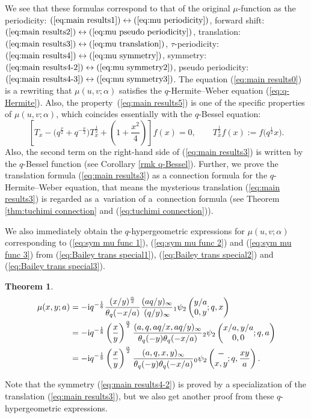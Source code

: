 \documentclass[pdftex]{sigma}
\numberwithin{equation}{section}
\newtheorem{thm}{Theorem}[section]
\theoremstyle{definition}
\begin{document}
We see that these formulas correspond to that of the original $\mu$-function as the periodicity: $(\ref{eq:main results1})\leftrightarrow(\ref{eq:mu periodicity})$,
forward shift: $(\ref{eq:main results2})\leftrightarrow(\ref{eq:mu pseudo periodicity})$,
translation: $(\ref{eq:main results3})\leftrightarrow(\ref{eq:mu translation})$,
$\tau$-periodicity: $(\ref{eq:main results4})\leftrightarrow(\ref{eq:mu symmetry})$,
symmetry: $(\ref{eq:main results4-2})\leftrightarrow(\ref{eq:mu symmetry2})$,
pseudo periodicity: $(\ref{eq:main results4-3})\leftrightarrow(\ref{eq:mu symmetry3})$.
The equation (\ref{eq:main results0}) is a rewriting that $\mu(u,v;\alpha)$ satisfies the $q$-Hermite--Weber equation (\ref{eq:q-Hermite}).
Also, the property~(\ref{eq:main results5}) is one of the specific properties of $\mu(u,v;\alpha)$, which coincides essentially with the $q$-Bessel equation:
\[
\left[T_x-\big(q^\frac{\nu}{2}+q^{-\frac{\nu}{2}}\big)T_x^\frac{1}{2}+\left(1+\frac{x^2}{4}\right)\right]f(x)=0, \qquad T_{x}^{\frac{1}{2}}f(x):=f\big(q^{\frac{1}{2}}x\big).
\]
Also, the second term on the right-hand side of (\ref{eq:main results3}) is written by the $q$-Bessel function (see Corollary \ref{rmk q-Bessel}).
Further, we prove the translation formula (\ref{eq:main results3}) as a connection formula for the $q$-Hermite--Weber equation, that means the mysterious translation (\ref{eq:main results3}) is regarded as a~variation of a~connection formula (see Theorem \ref{thm:tuchimi connection} and (\ref{eq:tuchimi connection})).

We also immediately obtain the $q$-hypergeometric expressions for $\mu(u,v;\alpha)$ corresponding to (\ref{eq:sym mu func 1}), (\ref{eq:sym mu func 2}) and (\ref{eq:sym mu func 3}) from (\ref{eq:Bailey trans special1}), (\ref{eq:Bailey trans special2}) and (\ref{eq:Bailey trans special3}).
\begin{thm}\label{Theorem 3}
\begin{align*}
\mu(x,y;a)
 &=
 -{\rm i}q^{-\frac{1}{8}}\frac{(x/y)^\frac{\alpha}{2}}{\theta_q(-x/a)}\frac{(aq/y)_{\infty }}{(q/y)_{\infty }}{}_1\psi_2\left(\begin{matrix}y/a\\0,y\end{matrix};q,x\right) \\
 &=
 -{\rm i}q^{-\frac{1}{8}}\left(\frac{x}{y}\right)^\frac{\alpha}{2}\frac{(a,q,aq/x,aq/y)_{\infty }}{\theta_{q}(-y)\theta_{q}(-x/a)}{}_2\psi_2\left(\begin{matrix}x/a,y/a\\0,0\end{matrix};q,a\right) \\
 &=
 -{\rm i}q^{-\frac{1}{8}}\left(\frac{x}{y}\right)^\frac{\alpha}{2}\frac{(a,q,x,y)_{\infty }}{\theta_{q}(-y)\theta_{q}(-x/a)}{}_0\psi_2\left(\begin{matrix}-\\x,y\end{matrix};q,\frac{xy}{a}\right).
\end{align*}
\end{thm}
Note that the symmetry (\ref{eq:main results4-2}) is proved by a specialization of the translation (\ref{eq:main results3}), but we also get another proof from these $q$-hypergeometric expressions.
\end{document}
